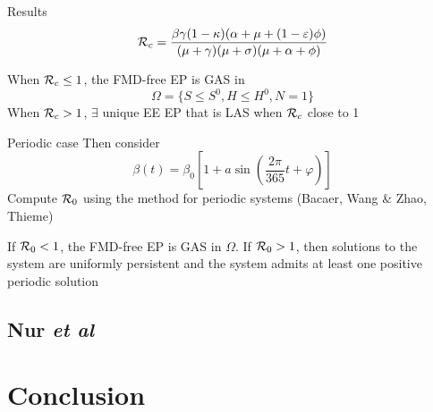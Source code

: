\documentclass[aspectratio=43]{beamer}
\begin{document}

\begin{frame}{Results}
  \begin{equation}
    \mathcal{R}_c = \frac{\beta\gamma(1-\kappa)(\alpha+\mu+(1-\varepsilon)\phi)}{(\mu+\gamma)(\mu+\sigma)(\mu+\alpha+\phi)}
  \end{equation}
  \begin{theorem}
    When $\mathcal{R}_c\leq 1$, the FMD-free EP is GAS in
    \[
      \Omega=\{
        S\leq S^0,H\leq H^0,N=1
      \}
    \]
    When $\mathcal{R}_c>1$, $\exists$ unique EE EP that is LAS when $\mathcal{R}_c$ close to 1
  \end{theorem}
\end{frame}


\begin{frame}{Periodic case}
  Then consider 
  \[
    \beta(t)=\beta_0\left[
      1+a\sin\left(
        \frac{2\pi}{365}t+\varphi
      \right)
    \right]
  \]
  Compute $\mathcal{R}_0$ using the method for periodic systems (Bacaer, Wang \& Zhao, Thieme)
\end{frame}


\begin{frame}
  \begin{theorem}
    If $\mathcal{R}_0<1$, the FMD-free EP is GAS in $\Omega$. If $\mathcal{R}_0>1$, then solutions to the system are uniformly persistent and the system admits at least one positive periodic solution
  \end{theorem}
\end{frame}

\subsection{Nur \emph{et al}}


\section{Conclusion}

\end{document}
